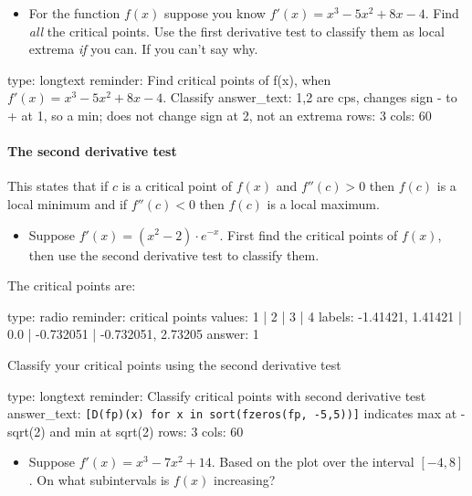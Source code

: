 \documentclass[12pt]{article}
\begin{document}
\begin{itemize}
\itemsep1pt\parskip0pt
\item
  For the function $f(x)$ suppose you know $f'(x)=x^3 - 5x^2 + 8x - 4$.
  Find \emph{all} the critical points. Use the first derivative test to
  classify them as local extrema \emph{if} you can. If you can't say
  why.
\end{itemize}

\begin{answer}
type: longtext
reminder: Find critical points of f(x), when \( f'(x)=x^3 - 5x^2 + 8x -4 \). Classify
answer_text: 1,2 are cps, changes sign - to + at 1, so a min; does not change sign at 2, not an extrema 
rows: 3
cols: 60
\end{answer}

\paragraph{The second derivative test}

This states that if $c$ is a critical point of $f(x)$ and $f''(c) > 0$
then $f(c)$ is a local minimum and if $f''(c) < 0$ then $f(c)$ is a
local maximum.

\begin{itemize}
\itemsep1pt\parskip0pt
\item
  Suppose $f'(x) = (x^2 - 2) \cdot e^{-x}$. First find the critical
  points of $f(x)$, then use the second derivative test to classify
  them.
\end{itemize}

The critical points are:

\begin{answer}
type: radio
reminder: critical points
values: 1 | 2 | 3 | 4
labels: -1.41421, 1.41421 | 0.0 | -0.732051 | -0.732051, 2.73205
answer: 1
\end{answer}

Classify your critical points using the second derivative test

\begin{answer}
type: longtext
reminder: Classify critical points with second derivative test
answer_text: \verb+[D(fp)(x) for x in sort(fzeros(fp, -5,5))]+ indicates max at -sqrt(2) and min at sqrt(2) 
rows: 3
cols: 60
\end{answer}

\begin{itemize}
\itemsep1pt\parskip0pt
\item
  Suppose $f'(x) = x^3 - 7x^2 + 14$. Based on the plot over the interval
  $[-4, 8]$. On what subintervals is $f(x)$ increasing?
\end{itemize}
\end{document}
